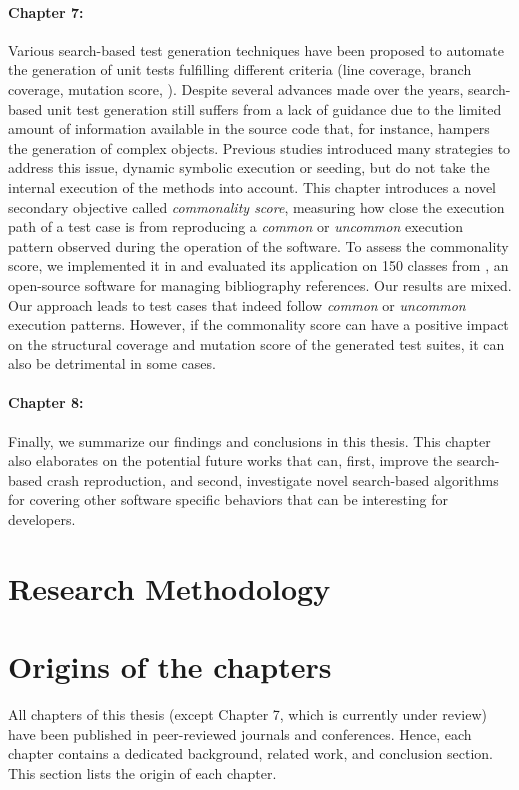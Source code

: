 \paragraph{Chapter 7:}%
Various search-based test generation techniques have been proposed to automate the generation of unit tests fulfilling different criteria (\eg line coverage, branch coverage, mutation score, \etc). Despite several advances made over the years, search-based unit test generation still suffers from a lack of guidance due to the limited amount of information available in the source code that, for instance, hampers the generation of complex objects. Previous studies introduced many strategies to address this issue, \eg dynamic symbolic execution or seeding, but do not take the internal execution of the methods into account.  
This chapter introduces a novel secondary objective called \emph{commonality score}, measuring how close the execution path of a test case is from reproducing a \emph{common} or \emph{uncommon} execution pattern observed during the operation of the software.
To assess the commonality score, we implemented it in \evosuite and evaluated its application on 150 classes from \jabref, an open-source software for managing bibliography references. 
Our results are mixed. Our approach leads to test cases that indeed follow \emph{common} or \emph{uncommon} execution patterns. However, if the commonality score can have a positive impact on the structural coverage and mutation score of the generated test suites, it can also be detrimental in some cases. 

\paragraph{Chapter 8:} 
Finally, we summarize our findings and conclusions in this thesis. This chapter also elaborates on the potential future works that can, first, improve the search-based crash reproduction, and second, investigate novel search-based algorithms for covering other software specific behaviors that can be interesting for developers.


\section{Research Methodology}




\section{Origins of the chapters}
All chapters of this thesis (except Chapter 7, which is currently under review) have been published in peer-reviewed journals and conferences. Hence, each chapter contains a dedicated background, related work, and conclusion section. This section lists the origin of each chapter.

